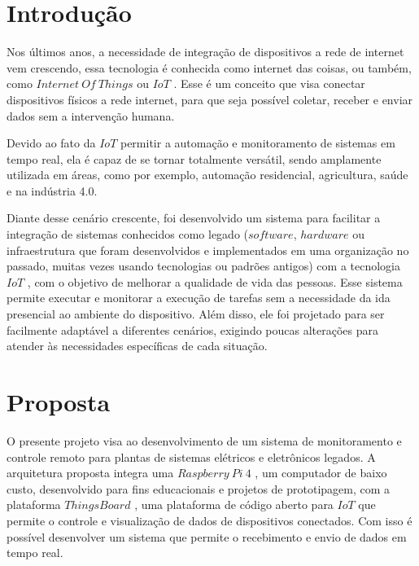\documentclass{ecatfg}
\begin{document}
\imprimirCabecalho
\imprimirResumo

	
\section{Introdução}
Nos últimos anos, a necessidade de integração de dispositivos a rede de internet vem crescendo, essa tecnologia é conhecida como internet das coisas, ou também, como $Internet\ Of\ Things$ ou $IoT$ \cite{IoT2029}. Esse é um conceito que visa conectar dispositivos físicos a rede internet, para que seja possível coletar, receber e enviar dados sem a intervenção humana.\par

Devido ao fato da $IoT$ permitir a automação e monitoramento de sistemas em tempo real, ela é capaz de se tornar totalmente versátil, sendo amplamente utilizada em áreas, como por exemplo, automação residencial, agricultura, saúde e na indústria 4.0.\par

Diante desse cenário crescente, foi desenvolvido um sistema para facilitar a integração de sistemas conhecidos como legado ($software$, $hardware$ ou infraestrutura que foram desenvolvidos e implementados em uma organização no passado, muitas vezes usando tecnologias ou padrões antigos) com a tecnologia $IoT$ \cite{iot}, com o objetivo de melhorar a qualidade de vida das pessoas. Esse sistema permite executar e monitorar a execução de tarefas sem a necessidade da ida presencial ao ambiente do dispositivo. Além disso, ele foi projetado para ser facilmente adaptável a diferentes cenários, exigindo poucas alterações para atender às necessidades específicas de cada situação.\par

\section{Proposta}
O presente projeto visa ao desenvolvimento de um sistema de monitoramento e controle remoto para plantas de sistemas elétricos e eletrônicos legados. A arquitetura proposta integra uma $Raspberry\ Pi\ 4$ \cite{rasp}, um computador de baixo custo, desenvolvido para fins educacionais e projetos de prototipagem, com a plataforma $ThingsBoard$ \cite{thingsBoard}, uma plataforma de código aberto para $IoT$ que permite o controle e visualização de dados de dispositivos conectados. Com isso é possível desenvolver um sistema que permite o recebimento e envio de dados em tempo real. \par
\end{document}
